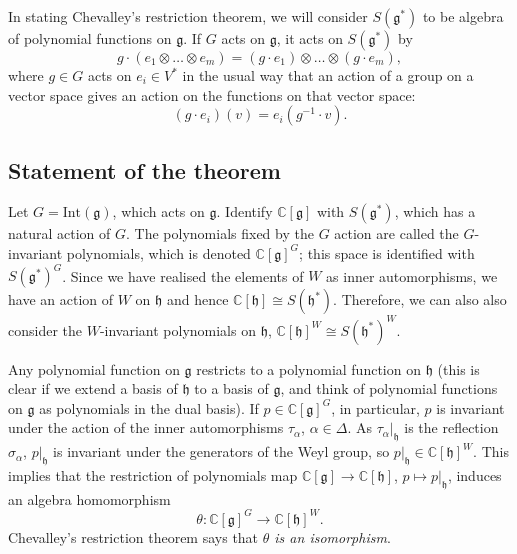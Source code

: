 \documentclass[12pt]{amsart}
\newcommand{\C}{\mathbb{C}}
\newcommand{\g}{\mathfrak{g}}
\newcommand{\h}{\mathfrak{h}}
\theoremstyle{remark}
\theoremstyle{remark}
\theoremstyle{remark}
\begin{document}
In stating Chevalley's restriction theorem, we will consider $S(\g^*)$ to be algebra of polynomial functions on $\g$.
If $G$ acts on $\g$, it acts on $S(\g^*)$ by
$$g \cdot (e_1 \otimes \ldots \otimes e_m) = (g\cdot e_1) \otimes \ldots \otimes (g \cdot e_m),$$
where $g \in G$ acts on $e_i \in V^*$ in the usual way that an action of a group on a vector space gives an action on the functions on that vector space:
$$(g\cdot e_i)(v) = e_i(g^{-1} \cdot v).$$

\subsection*{Statement of the theorem}
Let $G = \mathrm{Int}(\g)$, which acts on $\g$.
Identify $\C[\g]$ with $S(\g^*)$, which has a natural action of $G$.
The polynomials fixed by the $G$ action are called the $G$-invariant polynomials, which is denoted $\C[\g]^G$; this space is identified with $S(\g^*)^G$.
Since we have realised the elements of $W$ as inner automorphisms, we have an action of $W$ on $\h$ and hence $\C[\h] \cong S(\h^*)$.
Therefore, we can also also consider the $W$-invariant polynomials on $\h$, $\C[\h]^W \cong S(\h^*)^W$.

Any polynomial function on $\g$ restricts to a polynomial function on $\h$ (this is clear if we extend a basis of $\h$ to a basis of $\g$, and think of polynomial functions on $\g$ as polynomials in the dual basis).
If $p \in \C[\g]^G$, in particular, $p$ is invariant under the action of the inner automorphisms $\tau_\alpha$, $\alpha \in \Delta$.
As $\left. \tau_\alpha \right|_\h$ is the reflection $\sigma_\alpha$, $\left. p \right|_\h$ is invariant under the generators of the Weyl group, so $\left. p \right|_\h \in \C[\h]^W$.
This implies that the restriction of polynomials map $\C[\g] \to \C[\h]$, $p \mapsto \left. p \right|_\h$, induces an algebra homomorphism
$$\theta: \C[\g]^G \to \C[\h]^W.$$
Chevalley's restriction theorem says that \emph{$\theta$ is an isomorphism}.
\end{document}
